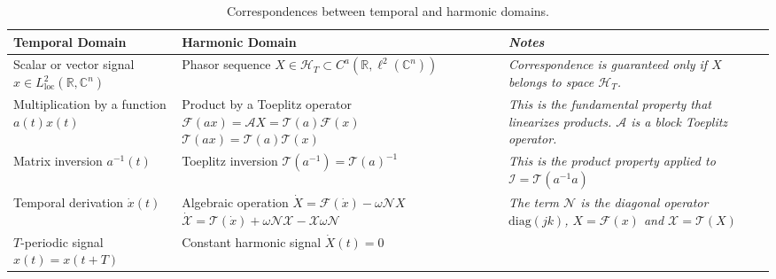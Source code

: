\documentclass[11pt,a4paper]{article}
\begin{document}
\begin{table}[!ht]
    \centering
    \caption{Correspondences between temporal and harmonic domains.}
    \renewcommand{\arraystretch}{1.4}
    \begin{tabularx}{0.98\textwidth}{>{\raggedright\arraybackslash}X >{\raggedright\arraybackslash}X >{\raggedright\itshape\small\arraybackslash}X}
        \toprule
        \textbf{Temporal Domain} & \textbf{Harmonic Domain} & \textbf{Notes} \\
        \midrule
        Scalar or vector signal \newline $x \in L^2_{\text{loc}}(\mathbb{R}, \mathbb{C}^n)$ &
        Phasor sequence \newline $X \in \mathcal{H}_T \subset C^a(\mathbb{R}, \ell^2(\mathbb{C}^n))$ &
        Correspondence is guaranteed only if $X$ belongs to space $\mathcal{H}_T$. \\
        \addlinespace
        Multiplication by a function \newline $a(t)x(t)$ &
        Product by a Toeplitz operator \newline $\mathcal{F}(ax) = \mathcal{A}X = \mathcal{T}(a) \mathcal{F}(x)$ \newline $\mathcal{T}(ax) = \mathcal{T}(a) \mathcal{T}(x)$ &
        This is the fundamental property that linearizes products. $\mathcal{A}$ is a block Toeplitz operator. \\
        \addlinespace
        Matrix inversion \newline $a^{-1}(t)$ &
        Toeplitz inversion \newline $\mathcal{T}(a^{-1}) = \mathcal{T}(a)^{-1}$ &
        This is the product property applied to $\mathcal{I} = \mathcal{T}(a^{-1} a)$ \\
        \addlinespace
        Temporal derivation \newline $\dot{x}(t)$ &
        Algebraic operation \newline $\dot{X} = \mathcal{F}(\dot{x}) - \omega \mathcal{N}X$ \newline $\dot{\mathcal{X}} = \mathcal{T}(\dot{x}) + \omega \mathcal{N}\mathcal{X} - \mathcal{X} \omega \mathcal{N}$ &
        The term $\mathcal{N}$ is the diagonal operator $\mathrm{diag}(jk)$, $X = \mathcal{F}(x)$ and $\mathcal{X} = \mathcal{T}(X)$ \\
        \addlinespace
        $T$-periodic signal \newline $x(t) = x(t+T)$ &
        Constant harmonic signal \newline $\dot{X}(t) = 0$ &

\end{tabularx}
\end{table}
\end{document}
